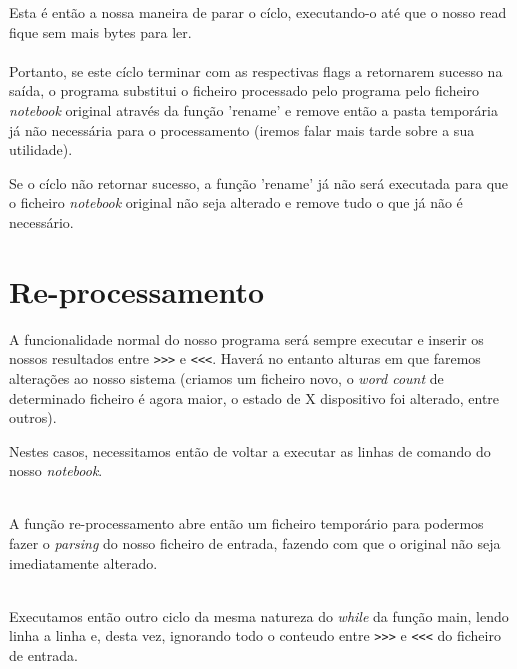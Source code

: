 \documentclass[11pt,a4paper]{report}
\begin{document}
Esta é então a nossa maneira de parar o cíclo, executando-o até que o nosso read fique sem mais bytes para ler.
~\\

~\\

Portanto, se este cíclo terminar com as respectivas flags a retornarem sucesso na saída, o programa substitui o ficheiro processado pelo programa pelo ficheiro  \textit{notebook} original através da função 'rename' e remove então a pasta temporária já não necessária para o processamento (iremos falar mais tarde sobre a sua utilidade).

Se o cíclo não retornar sucesso, a função 'rename' já não será executada para que o ficheiro \textit{notebook} original não seja alterado e remove tudo o que já não é necessário.


\section{Re-processamento}

A funcionalidade normal do nosso programa será sempre executar e inserir os nossos resultados entre \verb|>>>| e \verb|<<<|.
Haverá no entanto alturas em que faremos alterações ao nosso sistema (criamos um ficheiro novo, o \textit{word count} de determinado ficheiro é agora maior, o estado de X dispositivo foi alterado, entre outros). 

Nestes casos, necessitamos então de voltar a executar as linhas de comando do nosso \textit{notebook}.



~\\
A função re-processamento abre então um ficheiro temporário para podermos fazer o \textit{parsing} do nosso ficheiro de entrada, fazendo com que o original não seja imediatamente alterado.


~\\

Executamos então outro ciclo da mesma natureza do \textit{while} da função main, lendo linha a linha e, desta vez, ignorando todo o conteudo entre \verb|>>>| e \verb|<<<| do ficheiro de entrada.
\end{document}
